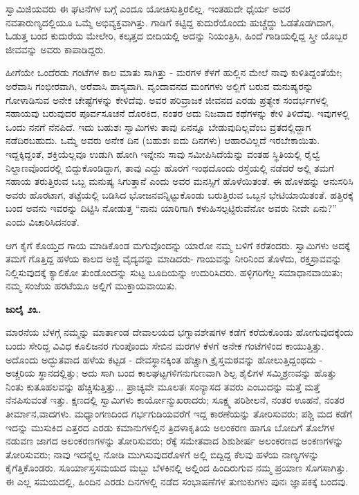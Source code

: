 ಸ್ವಾಮಿಜಿಯವರು ಈ ಘಟನೆಗಳ ಬಗ್ಗೆ ಎಂದೂ ಯೋಚಿಸುತ್ತಿರಲಿಲ್ಲ. ಇಂತಹುದೇ ಧೈರ್ಯ ಅವರ ನವತಾರುಣ್ಯದಲ್ಲಿಯೂ ಒಮ್ಮೆ ಅಭಿವ್ಯಕ್ತವಾಗಿತ್ತು. ಗಾಡಿಗೆ ಕಟ್ಟಿದ್ದ ಕುದುರೆಯೊಂದು ಹುಚ್ಚೆದ್ದು ಓಡತೊಡಗಿದಾಗ, ಓಡುತ್ತ ಬಂದ ಕುದುರೆಯ ಮೇಲೇರಿ, ಕಲ್ಕತ್ತದ ಬೀದಿಯಲ್ಲಿ ಅದನ್ನು ನಿಯಂತ್ರಿಸಿ, ಹಿಂದೆ ಗಾಡಿಯಲ್ಲಿದ್ದ ಸ್ತ್ರೀ ಯೊಬ್ಬರ ಜೀವವನ್ನು ಅವರು ಕಾಪಾಡಿದ್ದರು.

ಹೀಗೆಯೇ ಒಂದೆರಡು ಗಂಟೆಗಳ ಕಾಲ ಮಾತು ಸಾಗಿತ್ತು - ಮರಗಳ ಕೆಳಗೆ ಹುಲ್ಲಿನ ಮೇಲೆ ನಾವು ಕುಳಿತಿದ್ದಂತೆಯೇ; ಅರೆವಾಸಿ ಗಂಭೀರವಾಗಿ, ಅರೆವಾಸಿ ಹಾಸ್ಯವಾಗಿ. ವೃಂದಾವನದ ಮಂಗಗಳು ಅಲ್ಲಿಗೆ ಬರುವ ಮನುಷ್ಯರನ್ನು ಗೋಳಾಡಿಸುವ ಅನೇಕ ಚೇಷ್ಟೆಗಳನ್ನು ಕೇಳಿದೆವು. ಅವರ ಪರಿವ್ರಾಜಕ ಜೀವನದ ಎರಡು ಪ್ರತ್ಯೇಕ ಸಂದರ್ಭಗಳಲ್ಲಿ ಸಹಾಯವು ಬರುವುದರ ಪೂರ್ವಸೂಚನೆ ದೊರಕಿದ, ನಂತರ ಅದು ನಿಜವಾದ ಕಥೆಗಳನ್ನು ಕೇಳಿ ತಿಳಿದೆವು. ಇವುಗಳಲ್ಲಿ ಒಂದು ನನಗೆ ನೆನಪಿದೆ. ಇದು ಬಹುಶಃ ಸ್ವಾಮಿಗಳು ತಾವು ಏನನ್ನೂ ಬೇಡುವುದಿಲ್ಲವೆಂಬ ವ್ರತದಲ್ಲಿದ್ದಾಗ ನಡೆದಿರಬಹುದು. ಒಮ್ಮೆ ಅವರು ಅನೇಕ ದಿನ (ಬಹುಶಃ ಐದು ದಿನಗಳು) ಆಹಾರವಿಲ್ಲದೆ ಇರಬೇಕಾಯಿತು. ಇದ್ದಕ್ಕಿದ್ದಂತೆ, ಶಕ್ತಿಯೆಲ್ಲವೂ ಉಡುಗಿ ಹೋಗಿ ಇನ್ನೇನು ಸಾವು ಸಮೀಪಿಸಿದೆಯೆನ್ನು ವಂತಹ ಸ್ಥಿತಿಯಲ್ಲಿ ರೈಲ್ವೆ ನಿಲ್ದಾಣವೊಂದರಲ್ಲಿ ಬಿದ್ದುಕೊಂಡಿದ್ದಾಗ, ತಾವು ಎದ್ದು ಹೊರಗೆ ಇಂಥದೊಂದು ರಸ್ತೆಯಲ್ಲಿ ನಡೆದರೆ ಅಲ್ಲಿ ತಮಗೆ ಸಹಾಯ ತರುತ್ತಿರುವ ಒಬ್ಬ ಮನುಷ್ಯ ಸಿಗುತ್ತಾನೆ ಎಂದು ಅವರ ಮನಸ್ಸಿಗೆ ಹೊಳೆಯಿತಂತೆ. ಈ ಹೊಳಹನ್ನು ಅನುಸರಿಸಿ ಅವರು ಹೊರಟಾಗ, ತಟ್ಟೆಯಲ್ಲಿ ಬಡಿಸಿದ ಭೋಜನವನ್ನಿಟ್ಟುಕೊಂಡು ಬರುತ್ತಿರುವ ಒಬ್ಬನ ಭೇಟಿಯಾಯಿತಂತೆ. ಹತ್ತಿರಕ್ಕೆ ಬಂದ ಅವನು ಇವರನ್ನು ದಿಟ್ಟಿಸಿ ನೋಡುತ್ತ “ನಾನು ಯಾರಿಗಾಗಿ ಕಳುಹಿಸಲ್ಪಟ್ಟಿರುವೆನೋ ಅವರು ನೀವೇ ಏನು?” ಎಂದು ವಿಚಾರಿಸಿದನಂತೆ.

ಆಗ ಕೈಗೆ ಕೊಯ್ತದ ಗಾಯ ಮಾಡಿಕೊಂಡ ಮಗುವೊಂದನ್ನು ಯಾರೋ ನಮ್ಮ ಬಳಿಗೆ ಕರೆತಂದರು. ಸ್ವಾಮಿಗಳು ಅದಕ್ಕೆ ತಮಗೆ ಗೊತ್ತಿದ್ದ ಹಳೆಯ ಕಾಲದ ಅಜ್ಜಿ ವೈದ್ಯವನ್ನು ಮಾಡಿದರು- ಗಾಯವನ್ನು ನೀರಿನಿಂದ ತೊಳೆದು, ರಕ್ತಸ್ರಾವವನ್ನು ನಿಲ್ಲಿಸುವುದಕ್ಕೆ ಕ್ಯಾಲಿಕೋ ತುಂಡೊಂದನ್ನು ಸುಟ್ಟ ಬೂದಿಯನ್ನು ಉದುರಿಸಿದರು. ಹಳ್ಳಿಗರಿಗೆಲ್ಲ ಸಮಾಧಾನವಾಯಿತು; ನಮ್ಮ ಸಂಜೆಯ ಹರಟೆಯೂ ಅಲ್ಲಿಗೆ ಮುಕ್ತಾಯವಾಯಿತು.

\textbf{ಜುಲೈ ೨೩.}

ಮಾರನೆಯ ಬೆಳಗ್ಗೆ ನಮ್ಮನ್ನು ಮಾರ್ತಾಂಡ ದೇವಾಲಯದ ಭಗ್ನಾವಶೇಷಗಳ ಕಡೆಗೆ ಕರೆದುಕೊಂಡು ಹೋಗುವುದಕ್ಕೆಂದು ಬಂದು ಸೇರಿದ್ದ ವಿವಿಧ ಕೂಲಿಜನರ ಗುಂಪೊಂದು ಸೇಬಿನ ಮರಗಳ ಕೆಳಗೆ ಅನೇಕ ಗಂಟೆಗಳಿಂದ ಕಾಯುತ್ತಿತ್ತು. ಅದೊಂದು ಅದ್ಭುತವಾದ ಹಳೆಯ ಕಟ್ಟಡ - ದೇವಸ್ಥಾನಕ್ಕಿಂತ ಹೆಚ್ಚಾಗಿ ಕ್ರೈಸ್ತಮಠವನ್ನು ಹೋಲುತ್ತಿದ್ದಂಥದು - ಅಚ್ಚರಿಯ ಸ್ಥಾನದಲ್ಲಿತ್ತು; ಅದು ಸಾಗಿ ಬಂದ ಕಾಲಘಟ್ಟಗಳಿಗನುಗುಣವಾಗಿ ಶಿಲ್ಪ ಶೈಲಿಗಳ ಸಮ್ಮಿಶ್ರಣವನ್ನು ಹೊತ್ತು ನಿಂತು ಕುತೂಹಲವನ್ನು ಹೆಚ್ಚಿಸುತ್ತಿತ್ತು... ಪ್ರಾಚ್ಯವೇ ಮೂಲತಃ ಸಂನ್ಯಾಸದ ತವರು ಎಂಬುದನ್ನು ಮತ್ತೆ ಮತ್ತೆ ನೆನಪಿಸುವಂತೆ ಇತ್ತು. ಕ್ಷಣದಲ್ಲಿ ಸ್ವಾಮಿಗಳು ಕಾರ್ಯೋನ್ಮುಖರಾದರು; ಸೂಕ್ಷ್ಮ ಪರಿಶೀಲನೆ, ನಂತರ ಊಹನೆ, ನಂತರ ತೀರ್ಮಾನ,ವಾದಗಳು. ಮಧ್ಯಾಂಗಣದಿಂದ ಗರ್ಭಗುಡಿಯವರೆಗೆ ಇದ್ದ ಕಾರಣೆಯನ್ನು ತೋರಿಸುವರು; ಪಶ್ಚಿ ಮದ ಕಡೆಗೆ ಇದನ್ನು ಮುಸುಕಿದ ಎತ್ತರದ ಎರಡು ಕಮಾನುಗಳಲ್ಲಿನ ತ್ರಿದಳಾಕೃತಿಯ ಅಲಂಕರಣ ಹಾಗೂ ಬೋದಿಗೆ ತೊಲೆಗಳ ನಡುವಣ ಜಾಗದ ಅಲಂಕರಣಗಳನ್ನು ತೋರಿಸುವರು; ರೆಕ್ಕೆ ಸಮೇತವಾದ ಶಿಶುಶೀರ್ಷ ಅಲಂಕರಣದ ಅಂಕಣಗಳನ್ನು ತೋರಿಸುವರು; ನಾವು ಇದನ್ನೆಲ್ಲ ನೋಡಿ ಮುಗಿಸುವುದರೊಳಗೆ ಅಲ್ಲಿ ಬಿದ್ದಿದ್ದ ಕೆಲವು ಹಳೆಯ ನಾಣ್ಯಗಳನ್ನು ಕೈಗೆತ್ತಿಕೊಂಡರು. ಸೂರ್ಯಾಸ್ತಸಮಯದ ಮಬ್ಬು ಬೆಳಕಿನಲ್ಲಿ ಅಲ್ಲಿಂದ ಹಿಂದಿರುಗುವ ನಮ್ಮ ಪ್ರಯಾಣ ಸೊಗಸಾಗಿತ್ತು. ಈ ಎಲ್ಲ ಸಮಯದಲ್ಲಿ, ಹಿಂದಿನ ಎರಡು ದಿನಗಳಲ್ಲಿ ನಡೆದ ಸಂಭಾಷಣೆಗಳ ತುಣುಕುಗಳು ಪುನಃ ಜ್ಞಾಪಕಕ್ಕೆ ಬಂದವು.

